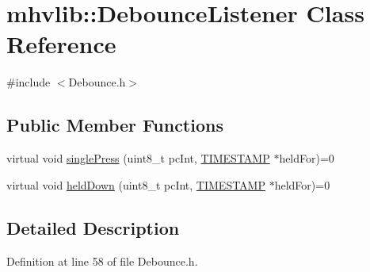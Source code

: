 \hypertarget{classmhvlib_1_1_debounce_listener}{\section{mhvlib\-:\-:Debounce\-Listener Class Reference}
\label{classmhvlib_1_1_debounce_listener}
}


{\ttfamily \#include $<$Debounce.\-h$>$}

\subsection*{Public Member Functions}
\begin{DoxyCompactItemize}
\item 
virtual void \hyperlink{classmhvlib_1_1_debounce_listener_afa3e66c3f00f8e83f052553c7f98d08c}{single\-Press} (uint8\-\_\-t pc\-Int, \hyperlink{namespacemhvlib_ae0658d1591e8aabca3a4b259a0c483cd}{T\-I\-M\-E\-S\-T\-A\-M\-P} $\ast$held\-For)=0
\item 
virtual void \hyperlink{classmhvlib_1_1_debounce_listener_a38744d95323ca5c208d38fcb3ea3f91f}{held\-Down} (uint8\-\_\-t pc\-Int, \hyperlink{namespacemhvlib_ae0658d1591e8aabca3a4b259a0c483cd}{T\-I\-M\-E\-S\-T\-A\-M\-P} $\ast$held\-For)=0
\end{DoxyCompactItemize}


\subsection{Detailed Description}


Definition at line 58 of file Debounce.\-h.



